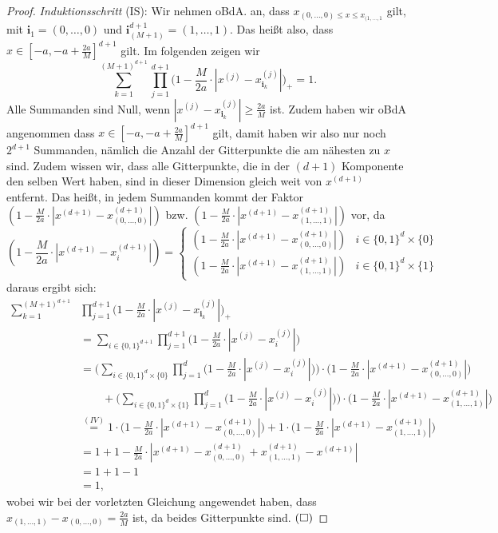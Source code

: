 \begin{proof}
\emph{Induktionsschritt} (IS): Wir nehmen oBdA. an, dass $x_{(0,\dots,0) \leq x \leq x_{(1,\dots,1}}$ gilt, mit $\mathbf{i}_1 = (0,\dots,0)$ und $\mathbf{i}_{(M + 1)}^{d + 1} = (1,\dots,1).$ Das heißt also, dass $x \in [-a, -a + \frac{2a}{M}]^{d + 1}$ gilt. Im folgenden zeigen wir $$\sum_{k = 1}^{(M + 1)^{d + 1}} \prod_{j = 1}^{d + 1} \bigg(1 - \frac{M}{2a} \cdot |x^{(j)} - x_{\mathbf{i}_k}^{(j)}|\bigg)_+ = 1.$$
Alle Summanden sind Null, wenn $|x^{(j)} - x_{\mathbf{i}_k}^{(j)}| \geq \frac{2a}{M}$ ist. Zudem haben wir oBdA angenommen dass $x \in [-a, -a + \frac{2a}{M}]^{d + 1}$ gilt, damit haben wir also nur noch $2^{d + 1}$ Summanden, nämlich die Anzahl der Gitterpunkte die am nähesten zu $x$ sind. Zudem wissen wir, dass alle Gitterpunkte, die in der $(d + 1)$ Komponente den selben Wert haben, sind in dieser Dimension gleich weit von $x^{(d + 1)}$ entfernt. Das heißt, in jedem Summanden kommt der Faktor $(1 - \frac{M}{2a} \cdot |x^{(d + 1)} - x_{(0,\dots,0)}^{(d + 1)}|)$ bzw. $(1 - \frac{M}{2a} \cdot |x^{(d + 1)} - x_{(1,\dots,1)}^{(d + 1)}|)$ vor, da 
\begin{equation*}
(1 - \frac{M}{2a} \cdot |x^{(d + 1)} - x_i^{(d + 1)}|) = \begin{cases}
(1 - \frac{M}{2a} \cdot |x^{(d + 1)} - x_{(0,\dots,0)}^{(d + 1)}|) &\text{$i \in \{0, 1\}^d \times \{0\}$}\\
(1 - \frac{M}{2a} \cdot |x^{(d + 1)} - x_{(1,\dots,1)}^{(d + 1)}|) &\text{$i \in \{0, 1\}^d \times \{1\}$}
\end{cases}
\end{equation*}
daraus ergibt sich$\colon$
\begin{equation*}
\begin{split}
\sum_{k = 1}^{(M + 1)^{d + 1}} & \prod_{j = 1}^{d + 1} \bigg(1 - \frac{M}{2a} \cdot |x^{(j)} - x_{\mathbf{i}_k}^{(j)}|\bigg)_+ \\
& = \sum_{i \in \{0, 1\}^{d + 1}} \prod_{j = 1}^{d + 1} \bigg(1 - \frac{M}{2a} \cdot |x^{(j)} - x_i^{(j)}|\bigg) \\
& = \Bigg(\sum_{i \in \{0, 1\}^d \times \{0\}} \prod_{j = 1}^{d} \bigg(1 - \frac{M}{2a} \cdot |x^{(j)} - x_i^{(j)}|\bigg)\Bigg) \cdot \bigg(1 - \frac{M}{2a} \cdot |x^{(d + 1)} - x_{(0,\dots,0)}^{(d + 1)}|\bigg) \\
& \qquad + \Bigg(\sum_{i \in \{0, 1\}^d \times \{1\}} \prod_{j = 1}^{d} \bigg(1 - \frac{M}{2a} \cdot |x^{(j)} - x_i^{(j)}|\bigg)\Bigg) \cdot \bigg(1 - \frac{M}{2a} \cdot |x^{(d + 1)} - x_{(1,\dots,1)}^{(d + 1)}|\bigg) \\
& \stackrel{(IV)}{=} 1 \cdot \bigg(1 - \frac{M}{2a} \cdot |x^{(d + 1)} - x_{(0,\dots,0)}^{(d + 1)}|\bigg) + 1 \cdot \bigg(1 - \frac{M}{2a} \cdot |x^{(d + 1)} - x_{(1,\dots,1)}^{(d + 1)}|\bigg) \\
& = 1 + 1 - \frac{M}{2a} \cdot |x^{(d + 1)} - x_{(0,\dots,0)}^{(d + 1)} + x_{(1,\dots,1)}^{(d + 1)} - x^{(d + 1)}| \\
& = 1 + 1 - 1 \\
& = 1,
\end{split}
\end{equation*}
wobei wir bei der vorletzten Gleichung angewendet haben, dass $x_{(1,\dots,1)} - x_{(0,\dots,0)} = \frac{2a}{M}$ ist, da beides Gitterpunkte sind.  $\hfill(\square)$ 		
		

\end{proof}
